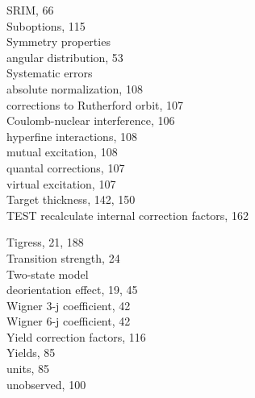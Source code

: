 \documentclass[10pt]{article}
\begin{document}
SRIM, 66\\
Suboptions, 115\\
Symmetry properties\\
angular distribution, 53\\
Systematic errors\\
absolute normalization, 108\\
corrections to Rutherford orbit, 107\\
Coulomb-nuclear interference, 106\\
hyperfine interactions, 108\\
mutual excitation, 108\\
quantal corrections, 107\\
virtual excitation, 107\\
Target thickness, 142, 150\\
TEST recalculate internal correction factors, 162

Tigress, 21, 188\\
Transition strength, 24\\
Two-state model\\
deorientation effect, 19, 45\\
Wigner 3-j coefficient, 42\\
Wigner 6-j coefficient, 42\\
Yield correction factors, 116\\
Yields, 85\\
units, 85\\
unobserved, 100
\end{document}
